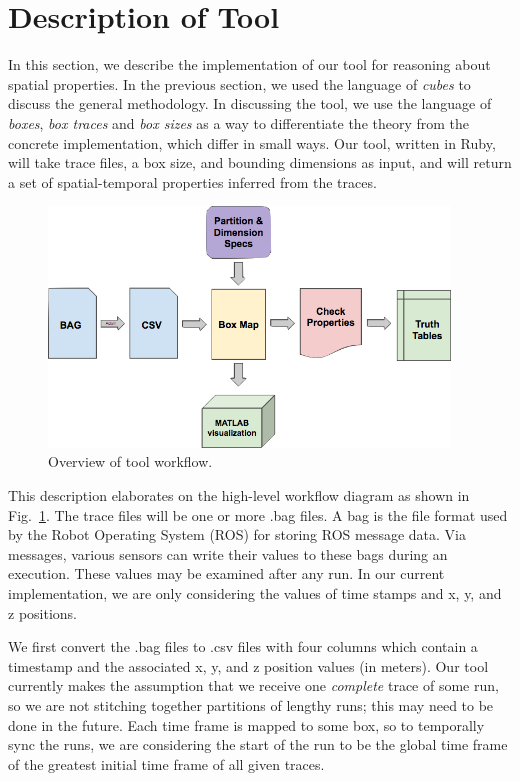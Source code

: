\section{Description of Tool}
\label{sec:tool}

In this section, we describe the implementation of our tool for reasoning about spatial properties.
In the previous section, we used the language of \emph{cubes} to discuss the general methodology. 
In discussing the tool, we use the language of \emph{boxes}, \emph{box traces} and \emph{box sizes} as a way to differentiate the theory from the concrete implementation, which differ in small ways.
Our tool, written in Ruby, will take trace files, a box size, and bounding dimensions as input, and will return a set of spatial-temporal properties inferred from the traces.  

\begin{figure}[ht]
  \centering
  \includegraphics[width=0.95\textwidth]{./figures/workflow}
  \caption{Overview of tool workflow.}
  \label{fig:workflow}
\end{figure}

This description elaborates on the high-level workflow diagram as shown in Fig.~\ref{fig:workflow}.
The trace files will be one or more .bag files.  
A bag is the file format used by the Robot Operating System (ROS) for storing ROS message data.  
Via messages, various sensors can write their values to these bags during an execution. 
These values may be examined after any run.
In our current implementation, we are only considering the values of time stamps and x, y, and z positions.

We first convert the .bag files to .csv files with four columns which contain a timestamp and the associated x, y, and z position values (in meters).  
 Our tool currently makes the assumption that we receive one \emph{complete} trace of some run, so we are not stitching together partitions of lengthy runs; this may need to be done in the future.
 Each time frame is mapped to some box, so to temporally sync the runs, we are considering the start of the run to be the global time frame of the greatest initial time frame of all given traces.

